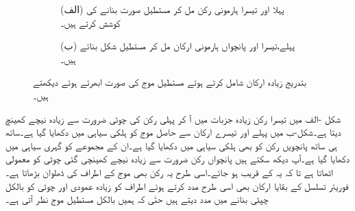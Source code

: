 \begin{figure}
\centering
\begin{subfigure}{0.5\textwidth}
\centering
{}
\caption*{(الف) پہلا اور تیسرا ہارمونی رکن مل کر مستطیل صورت بنانے کی کوشش کرتے ہیں۔}
\end{subfigure}%
\begin{subfigure}{0.5\textwidth}
\centering
{}
\caption*{(ب) پہلے،تیسرا اور پانچواں ہارمونی ارکان مل کر مستطیل شکل بناتے ہیں۔}
\end{subfigure}
\caption{بتدریج زیادہ ارکان شامل کرتے ہوئے مستطیل موج کی صورت ابھرتے ہوئے دیکھتے ہیں۔}
\label{شکل_فوریئر_ابھرتا_مستطیل}
\end{figure}

شکل -الف میں تیسرا رکن زیادہ جزبات میں آ کر پہلی رکن کی چوٹی ضرورت سے زیادہ نیچے کھینچ  دیتا ہے۔شکل-ب میں پہلے اور تیسرے ارکان سے حاصل موج کو ہلکی سیاہی میں دکھایا گیا ہے۔ساتھ ہی ساتھ پانچویں رکن کو بھی ہلکی سیاہی میں دکھایا گیا ہے۔ان کے مجموعے کو گہری سیاہی میں دکھایا گیا ہے۔آپ دیکھ سکتے ہیں پانچواں رکن ضرورت سے زیادہ نیچے کھینچی گئی چوٹی کو معمولی اٹھاتا ہے تا کہ یہ  کے قریب ہو جائے۔اسی طرح یہ رکن بھی موج کے اطراف کی ڈھلوان بڑھاتا ہے۔فوریئر تسلسل کے بقایا ارکان بھی اسی طرح مدد کرتے ہوئے اطراف کو زیادہ عمودی اور چوٹی کو بالکل چپٹی بنانے میں مدد دیتے ہیں حتٰی کہ ہمیں بالکل مستطیل موج نظر آتی ہے۔

